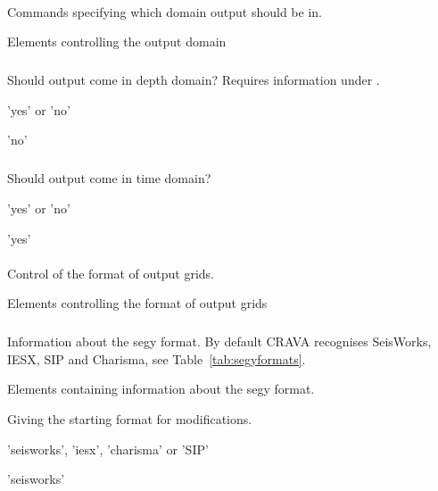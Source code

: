 \paragraph{}
 \slist
   \item \Description Commands specifying which domain output should be in.
   \item \Argument Elements controlling the output domain
   \item \Default
 \elist

\subparagraph{}
 \slist
   \item \Description Should output come in depth domain? Requires information under .
   \item \Argument 'yes' or 'no'
   \item \Default 'no'
 \elist

\subparagraph{}
 \slist
   \item \Description Should output come in time domain?
   \item \Argument 'yes' or 'no'
   \item \Default 'yes'
 \elist

\paragraph{}
 \slist
   \item \Description Control of the format of output grids.
   \item \Argument Elements controlling the format of output grids
   \item \Default
 \elist

\subparagraph{}
 \slist
   \item \Description Information about the segy format. By default CRAVA recognises SeisWorks, IESX, SIP and Charisma, see Table~\ref{tab:segyformats}.
   \item \Argument Elements containing information about the segy format.
   \item \Default
 \elist

 \slist
   \item \Description Giving the starting format for modifications.
   \item \Argument 'seisworks', 'iesx', 'charisma' or 'SIP'
   \item \Default 'seisworks'
 \elist

